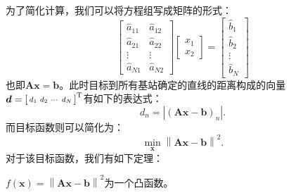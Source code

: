 为了简化计算，我们可以将方程组写成矩阵的形式：
\[
    \begin{bmatrix}
        \hat{a}_{11} & \hat{a}_{12} \\
        \hat{a}_{21} & \hat{a}_{22} \\
        \vdots       & \vdots       \\
        \hat{a}_{N1} & \hat{a}_{N2}
    \end{bmatrix}
    \begin{bmatrix}
        x_1 \\
        x_2
    \end{bmatrix}
    =
    \begin{bmatrix}
        \hat{b}_1 \\
        \hat{b}_2 \\
        \vdots    \\
        \hat{b}_N
    \end{bmatrix}
\]
也即\( \mathbf{A} \bm{x} = \bm{b} \)。此时目标到所有基站确定的直线的距离构成的向量\( \boldsymbol{d} = \begin{bsmallmatrix} d_1 & d_2 & \cdots & d_N \end{bsmallmatrix}^{\mathrm{T}} \)有如下的表达式：
\[
    d_n = \left| (\mathbf{A} \bm{x} - \bm{b})_n \right|.
\]
而目标函数则可以简化为：
\[
    \min_{\bm{x}} \left\| \mathbf{A} \bm{x} - \bm{b} \right\|^2.
\]
对于该目标函数，我们有如下定理：
\begin{theorem}
    \( f(\bm{x})  = \left\| \mathbf{A} \bm{x} - \bm{b} \right\|^2 \)为一个凸函数。
\end{theorem}

